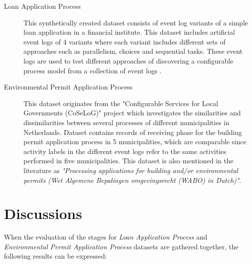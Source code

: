 \begin{description}
  \item[Loan Application Process \cite{loan-app-data}] This synthetically created dataset consists of event log variants of a simple loan application in a financial institute. This dataset includes artificial event logs of 4 variants where each variant includes different sets of approaches such as parallelism, choices and sequential tasks. These event logs are used to test different approaches of discovering a configurable process model from a collection of event logs \cite{buijs2014flexible}.
  \item[Environmental Permit Application Process \cite{coselog-data}] This dataset originates from the "Configurable Services for Local Governments (CoSeLoG)" project \cite{van2011business} which investigates the similarities and dissimilarities between several processes of different municipalities in Netherlands. Dataset contains records of receiving phase for the building permit application process in 5 municipalities, which are comparable since activity labels in the different event logs refer to the same activities performed in five municipalities. This dataset is also mentioned in the literature as \textit{"Processing applications for building and/or environmental permits (Wet Algemene Bepalingen omgevingsrecht (WABO) in Dutch)"}.
\end{description}


\section{Discussions}
\label{sec:discussions}
When the evaluation of the stages for \textit{Loan Application Process} and \textit{Environmental Permit Application Process} datasets are gathered together, the following results can be expressed:

